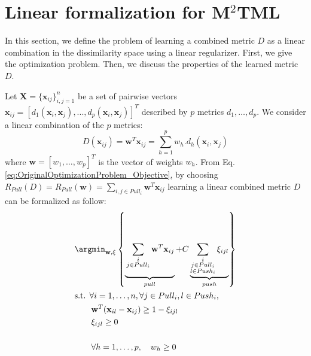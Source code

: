 \section{Linear formalization for M$^2$TML}

In this section, we define the problem of learning a combined metric $D$ as a linear combination in the dissimilarity space using a linear regularizer. First, we give the optimization problem. Then, we discuss the properties of the learned metric $D$.

\noindent Let $\textbf{X} = \{\textbf{x}_{ij}\}_{i,j=1}^n$ be a set of pairwise vectors $\textbf{x}_{ij}=[d_1(\textbf{x}_i,\textbf{x}_j), ..., d_p(\textbf{x}_i,\textbf{x}_j)]^T$  described by $p$ metrics $d_1, \ldots, d_p$. We consider a linear combination of the $p$ metrics:
\begin{equation}
D(\textbf{x}_{ij})=\textbf{w}^T\textbf{x}_{ij} = \sum_{h=1}^p w_h.d_h(\textbf{x}_i,\textbf{x}_j)
\label{eq:D_linear}
\end{equation}
where $\textbf{w}=[w_1, \ldots, w_p]^T$ is the vector of weights $w_h$. From Eq. \ref{eq:OriginalOptimizationProblem_Objective}, by choosing $R_{Pull}(D) = R_{Pull}(\textbf{w}) = \sum\limits_{i, j \in Pull_i} \textbf{w}^T\textbf{x}_{ij}$ learning a linear combined metric $D$ can be formalized as follow:
\begin{align}
		&\displaystyle 		\argmin_{\textbf{w},\xi}
		\left\lbrace \underbrace{
		\vphantom{ \sum\limits_{\substack{i \\ j \in Pull_i \\ l \in Push_i}} \xi_{ijl} }
			\sum\limits_{\substack{i \\ j \in Pull_i}} \textbf{w}^T\textbf{x}_{ij}
		}_{pull}					
		+	
		C \underbrace{				
			\sum\limits_{\substack{i \\ j \in Pull_i \\ l \in Push_i}}  \xi_{ijl}
		}_{push} \right\rbrace \nonumber \\
 		&\text{s.t.  } \forall i = 1, \ldots, n, \forall j \in Pull_i, l \in Push_i, \label{eq:MMLPrimal} \\
		& \qquad \textbf{w}^T(\textbf{x}_{il}-\textbf{x}_{ij}) \geq 1-\xi_{ijl}  \nonumber \\
		& \qquad \xi_{ijl} \geq 0 \nonumber \\
		& \nonumber \\
		& \qquad \forall h=1, \ldots, p, \quad w_h \geq 0 \label{eq:MMLPrimal_constraint_pos}
\end{align}

